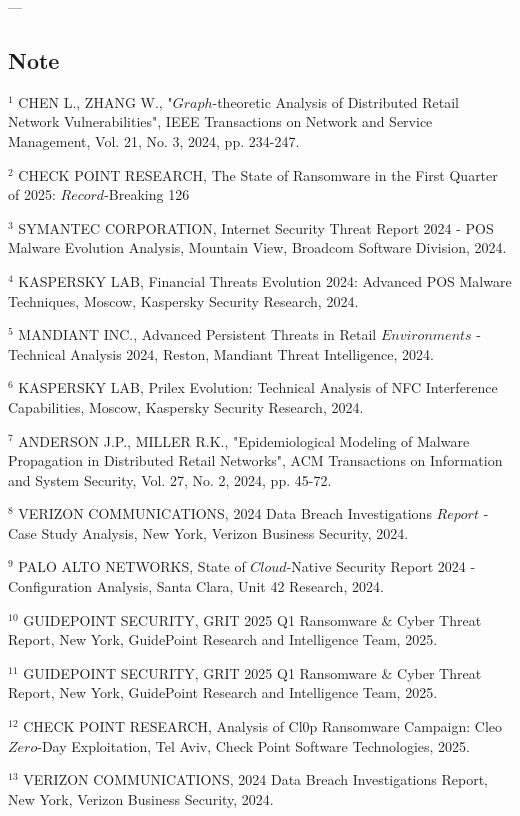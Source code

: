 {---

\subsection{Note}

$^{1}$ CHEN L., ZHANG W., "$Graph$-theoretic Analysis of Distributed Retail Network Vulnerabilities", IEEE Transactions on Network and Service Management, Vol. 21, No. 3, 2024, pp. 234-247.

$^{2}$ CHECK POINT RESEARCH, The State of Ransomware in the First Quarter of 2025: $Record$-Breaking 126%

$^{3}$ SYMANTEC CORPORATION, Internet Security Threat Report 2024 - POS Malware Evolution Analysis, Mountain View, Broadcom Software Division, 2024.

$^{4}$ KASPERSKY LAB, Financial Threats Evolution 2024: Advanced POS Malware Techniques, Moscow, Kaspersky Security Research, 2024.

$^{5}$ MANDIANT INC., Advanced Persistent Threats in Retail $Environments$ - Technical Analysis 2024, Reston, Mandiant Threat Intelligence, 2024.

$^{6}$ KASPERSKY LAB, Prilex Evolution: Technical Analysis of NFC Interference Capabilities, Moscow, Kaspersky Security Research, 2024.

$^{7}$ ANDERSON J.P., MILLER R.K., "Epidemiological Modeling of Malware Propagation in Distributed Retail Networks", ACM Transactions on Information and System Security, Vol. 27, No. 2, 2024, pp. 45-72.

$^{8}$ VERIZON COMMUNICATIONS, 2024 Data Breach Investigations $Report$ - Case Study Analysis, New York, Verizon Business Security, 2024.

$^{9}$ PALO ALTO NETWORKS, State of $Cloud$-Native Security Report 2024 - Configuration Analysis, Santa Clara, Unit 42 Research, 2024.

$^{10}$ GUIDEPOINT SECURITY, GRIT 2025 Q1 Ransomware & Cyber Threat Report, New York, GuidePoint Research and Intelligence Team, 2025.

$^{11}$ GUIDEPOINT SECURITY, GRIT 2025 Q1 Ransomware & Cyber Threat Report, New York, GuidePoint Research and Intelligence Team, 2025.

$^{12}$ CHECK POINT RESEARCH, Analysis of Cl0p Ransomware Campaign: Cleo $Zero$-Day Exploitation, Tel Aviv, Check Point Software Technologies, 2025.

$^{13}$ VERIZON COMMUNICATIONS, 2024 Data Breach Investigations Report, New York, Verizon Business Security, 2024.

}
